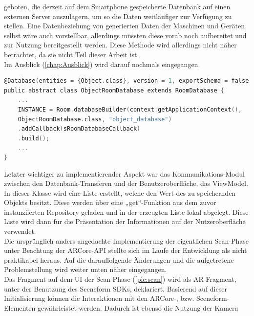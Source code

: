 geboten, die derzeit auf dem Smartphone gespeicherte Datenbank auf einen externen Server auszulagern, um so die Daten weitläufiger zur Verfügung zu stellen. 
Eine Datenbeziehung von generierten Daten der Maschinen und Geräten selbst wäre auch vorstellbar, allerdings müssten diese vorab noch aufbereitet 
und zur Nutzung bereitgestellt werden. Diese Methode wird allerdings nicht näher betrachtet, da sie nicht Teil dieser Arbeit ist. 
\\ 
Im Ausblick (\ref{chap:Ausblick}) wird darauf nochmals eingegangen.
\\ 
\linebreak
\begin{lstlisting}[language=C,
    frame=lines,           % Ein Rahmen um den Code (single for box, lines for top and bottom)
    xleftmargin=\parindent,  % Rahmen link von den Zahlen
    style=algoBericht,
    label={code:dblayer},
    captionpos=b,           % Caption unter den Code setzen
caption={Erzeugung des Datenbank-Layers „Room“}]
@Database(entities = {Object.class}, version = 1, exportSchema = false)
public abstract class ObjectRoomDatabase extends RoomDatabase {
    ...
    INSTANCE = Room.databaseBuilder(context.getApplicationContext(),
    ObjectRoomDatabase.class, "object_database")
    .addCallback(sRoomDatabaseCallback)
    .build();
    ...
}
\end{lstlisting}
Letzter wichtiger zu implementierender Aspekt war das Kommunikations-Modul zwischen den Datenbank-Transferen und der Benutzeroberfläche, das ViewModel. 
In dieser Klasse wird eine Liste erstellt, welche den Wert des zu speichernden Objekts besitzt. Diese werden über eine „get“-Funktion aus dem zuvor 
instanziierten Repository geladen und in der erzeugten Liste lokal abgelegt. Diese Liste wird dann für die Präsentation der Informationen auf der 
Nutzeroberfläche verwendet. %
\\ 
\linebreak
Die ursprünglich anders angedachte Implementierung der eigentlichen Scan-Phase unter Beachtung der ARCore-\acs{API} stellte sich im Laufe der Entwicklung 
als nicht praktikabel heraus. Auf die darauffolgende Änderungen und die aufgetretene Problemstellung wird weiter unten näher eingegangen. 
\\ 
Das Fragment auf dem \acl{UI} der Scan-Phase (\ref{pic:scan}) wird als \acs{AR}-Fragment, unter der Benutzung des Sceneform \acs{SDK}s, deklariert. Basierend auf 
dieser Initialisierung können die Interaktionen mit den ARCore-, bzw. Sceneform- Elementen gewährleistet werden. Dadurch ist ebenso die Nutzung der Kamera 
